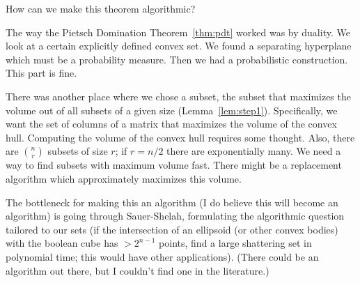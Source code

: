 



How can we make this theorem algorithmic?

The way the Pietsch Domination Theorem~\ref{thm:pdt} worked was by duality. 
We look at a certain explicitly defined convex set. We found a separating hyperplane which must be a probability measure. Then we had a probabilistic construction. This part is fine.

There was another place where we chose a subset, the subset that maximizes the volume out of all subsets of a given size (Lemma~\ref{lem:step1}). Specifically, we want the set of columns of a matrix that maximizes the volume of the convex hull.
Computing the volume of the convex hull requires some thought.
Also, there are $\binom nr$ subsets of size $r$; if $r=n/2$ there are exponentially many. We need a way to find subsets with maximum volume fast. There might be a replacement algorithm which approximately maximizes this volume.

The bottleneck for making this an algorithm (I do believe this will become an algorithm) is going through Sauer-Shelah, formulating the algorithmic question tailored to our sets (if the intersection of an ellipsoid (or other convex bodies) with the boolean cube has $>2^{n-1}$ points, find a large shattering set in polynomial time; this would have other applications). (There could be an algorithm out there, but I couldn't find one in the literature.)

